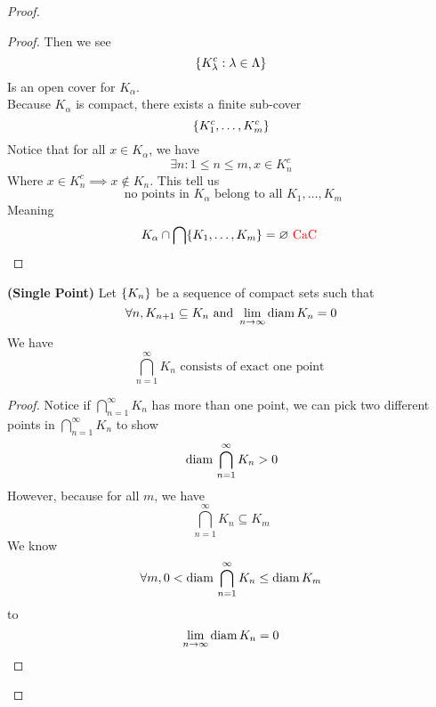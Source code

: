 \documentclass{report}
\begin{document}
\begin{proof}
\begin{proof}
Then we see
\begin{equation}
\{ K_{\lambda}^c: \lambda  \in\Lambda  \}
\end{equation}
Is an open cover for $K_\alpha $.\\

Because $K_\alpha $ is compact, there exists a finite sub-cover
\begin{equation}
\{ K^c_1,\dots, K^c_m \}
\end{equation}
Notice that for all $x\in K_\alpha $, we have
\begin{equation}
\exists n:1\leq n\leq m, x\in K^c_n 
\end{equation}
Where $x\in K_n^c\implies x\not\in K_n$. This tell us 
\begin{equation}
\text{ no points in $K_\alpha $ belong to all }K_1,\dots ,K_m
\end{equation}
Meaning
\begin{equation}
  K_{\alpha }\cap \bigcap \{ K_1,\dots, K_m \}=\varnothing\text{ \textcolor{red}{CaC} }
\end{equation}
\end{proof}
\begin{corollary}
\label{3.9.6}
\textbf{(Single Point)} Let $\{ K_n \}$ be a sequence of compact sets such that 
 \begin{equation}
   \forall n,K_{n+1}\subseteq K_n\text{ and }\lim_{n\to\infty}\text{diam}\, K_n=0
\end{equation}
We have
\begin{equation}
\bigcap_{n=1}^\infty K_n\text{ consists of exact one point }
\end{equation}
\end{corollary}
\begin{proof}
Notice if $\bigcap_{n=1}^\infty K_n$ has more than one point, we can pick two different points in $\bigcap_{n=1}^\infty K_n$ to show
\begin{equation}
  \text{diam}\, \bigcap_{n=1}^\infty K_n>0
\end{equation}
However, because for all $m$, we have
 \begin{equation}
\bigcap_{n=1}^\infty K_n\subseteq K_m
\end{equation}
We know
\begin{equation}
\forall m, 0<\text{diam}\, \bigcap_{n=1}^\infty K_n\leq \text{diam}\, K_m
\end{equation}
\CaC to
\begin{equation}
\lim_{n\to\infty}\text{diam}\, K_n=0
\end{equation}
\end{proof}

\end{proof}
\end{document}
